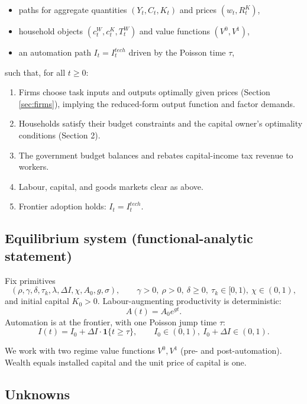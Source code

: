 \documentclass{article}
\begin{document}
\begin{itemize}
\item paths for aggregate quantities $(Y_t,C_t,K_t)$ and prices $(w_t,R^K_t)$,
\item household objects $(c^W_t,c^K_t,T^W_t)$ and value functions $(V^0,V^1)$,
\item an automation path $I_t = I^{tech}_t$ driven by the Poisson time $\tau$,
\end{itemize}

\noindent such that, for all $t\ge 0$:
\begin{enumerate}
\item Firms choose task inputs and outputs optimally given prices (Section \ref{sec:firms}), implying the reduced-form output function and factor demands.
\item Households satisfy their budget constraints and the capital owner's optimality conditions (Section 2).
\item The government budget balances and rebates capital-income tax revenue to workers.
\item Labour, capital, and goods markets clear as above.
\item Frontier adoption holds: $I_t = I^{tech}_t$.
\end{enumerate}


\subsection*{Equilibrium system (functional-analytic statement)}

Fix primitives
$$
(\rho,\gamma,\delta,\tau_k,\lambda,\Delta I,\chi,A_0,g,\sigma),
\qquad \gamma>0,\ \rho>0,\ \delta\ge 0,\ \tau_k\in[0,1),\ \chi\in(0,1),
$$
and initial capital $K_0>0$.
Labour-augmenting productivity is deterministic:
$$
A(t)=A_0 e^{gt}.
$$
Automation is at the frontier, with one Poisson jump time $\tau$:
$$
I(t) = I_0 + \Delta I\cdot \mathbf{1}\{t\ge \tau\},
\qquad I_0\in(0,1),\ I_0+\Delta I\in(0,1).
$$

We work with two regime value functions $V^0,V^1$ (pre- and post-automation). Wealth equals installed capital and the unit price of capital is one.

\subsection*{Unknowns}
\end{document}
